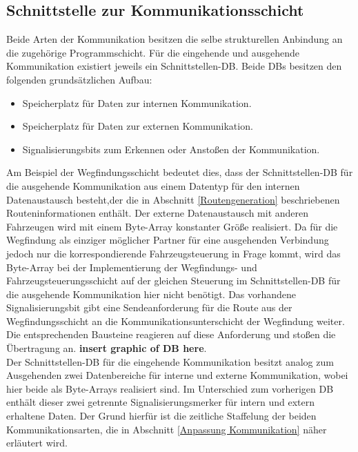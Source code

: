 	\subsection{Schnittstelle zur Kommunikationsschicht}
		
		Beide Arten der Kommunikation besitzen die selbe strukturellen Anbindung an die zugehörige Programmschicht. Für die eingehende und ausgehende Kommunikation existiert jeweils ein Schnittstellen-\ac{DB}. Beide \ac{DB}s besitzen den folgenden grundsätzlichen Aufbau:
		
		\begin{itemize}
			\item Speicherplatz für Daten zur internen Kommunikation.
			\item Speicherplatz für Daten zur externen Kommunikation.
			\item Signalisierungsbits zum Erkennen oder Anstoßen der Kommunikation.
		\end{itemize}
		
		Am Beispiel der Wegfindungsschicht bedeutet dies, dass der Schnittstellen-\ac{DB} für die ausgehende Kommunikation aus einem Datentyp für den internen Datenaustausch besteht,der die in Abschnitt \ref{Routengeneration} beschriebenen Routeninformationen enthält. Der externe Datenaustausch mit anderen Fahrzeugen wird mit einem Byte-Array konstanter Größe realisiert. Da für die Wegfindung als einziger möglicher Partner für eine ausgehenden Verbindung jedoch nur die korrespondierende Fahrzeugsteuerung  in Frage kommt, wird das Byte-Array bei der Implementierung der Wegfindungs- und Fahrzeugsteuerungsschicht auf der gleichen Steuerung  im Schnittstellen-\ac{DB} für die ausgehende Kommunikation hier nicht benötigt. Das vorhandene Signalisierungsbit gibt eine Sendeanforderung für die Route aus der Wegfindungsschicht an die Kommunikationsunterschicht der Wegfindung weiter. Die entsprechenden Bausteine reagieren auf diese Anforderung und stoßen die Übertragung an. \textbf{insert graphic of DB here}.
		\\
		Der Schnittstellen-DB für die eingehende Kommunikation besitzt analog zum Ausgehenden zwei Datenbereiche für interne und externe Kommunikation, wobei hier beide als Byte-Arrays realisiert sind. Im Unterschied zum vorherigen \ac{DB} enthält dieser zwei getrennte Signalisierungsmerker für intern und extern erhaltene Daten. Der Grund hierfür ist die zeitliche Staffelung der beiden Kommunikationsarten, die in Abschnitt \ref{Anpassung Kommunikation} näher erläutert wird.
		

